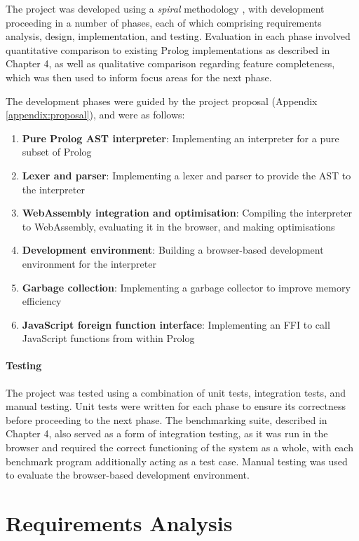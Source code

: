 \label{sec:dev-methodology}

The project was developed using a \emph{spiral} methodology \cite{boehmspiralmodelsoftware1986}, with development proceeding in a number of phases, each of which comprising requirements analysis, design, implementation, and testing. Evaluation in each phase involved quantitative comparison to existing Prolog implementations as described in Chapter 4, as well as qualitative comparison regarding feature completeness, which was then used to inform focus areas for the next phase.

The development phases were guided by the project proposal (Appendix \ref{appendix:proposal}), and were as follows:

\begin{enumerate}
\item \textbf{Pure Prolog AST interpreter}: Implementing an interpreter for a pure subset of Prolog
\item \textbf{Lexer and parser}: Implementing a lexer and parser to provide the AST to the interpreter
\item \textbf{WebAssembly integration and optimisation}: Compiling the interpreter to WebAssembly, evaluating it in the browser, and making optimisations
\item \textbf{Development environment}: Building a browser-based development environment for the interpreter
\item \textbf{Garbage collection}: Implementing a garbage collector to improve memory efficiency
\item \textbf{JavaScript foreign function interface}: Implementing an FFI to call JavaScript functions from within Prolog
\end{enumerate}

\paragraph{Testing} The project was tested using a combination of unit tests, integration tests, and manual testing. Unit tests were written for each phase to ensure its correctness before proceeding to the next phase. The benchmarking suite, described in Chapter 4, also served as a form of integration testing, as it was run in the browser and required the correct functioning of the system as a whole, with each benchmark program additionally acting as a test case. Manual testing was used to evaluate the browser-based development environment.

\section{Requirements Analysis}


